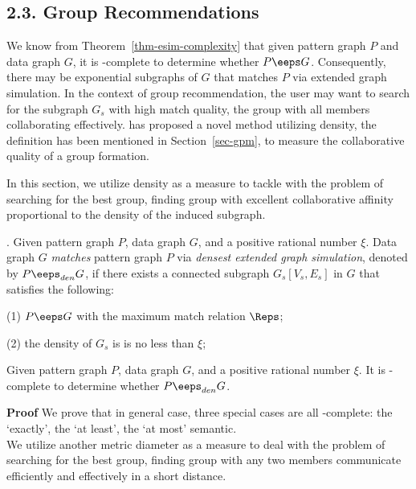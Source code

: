 \subsection*{2.3. Group Recommendations}

We know from Theorem~\ref{thm-esim-complexity} that given pattern graph $P$ and data graph $G$, it is \NP-complete to determine whether $P \eeps G$. Consequently, there may be exponential subgraphs of $G$ that matches $P$ via extended graph simulation. In the context of group recommendation, the user may want to search for the subgraph $G_s$ with high match quality, \ie the group with all members collaborating effectively.\cite{} has proposed a novel method utilizing density, the definition has been mentioned in Section~\ref{sec-gpm}, to measure the collaborative quality of a group formation.

In this section, we utilize density as a measure to tackle with the problem of searching for the best group, \ie finding group with excellent collaborative affinity proportional to the density of the induced subgraph.

. Given pattern graph $P$, data graph $G$, and a positive rational number $\xi$. Data graph $G$ {\em matches} pattern graph $P$  via {\em densest extended graph simulation}, denoted by $P \eeps_{den} G$, if there exists a connected subgraph $G_s[V_s, E_s]$ in $G$ that satisfies the following:

\vspace{0.5ex}
\ni(1) $P \eeps G$ with the maximum match relation $\Reps$;

\vspace{0.5ex}
\ni(2) the density of $G_s$ is is no less than $\xi$;

\begin{theorem}
\label{thm-esim-den-opt-complexity}
Given pattern graph $P$, data graph $G$, and a positive rational number $\xi$. It is \NP-complete to determine whether $P \eeps_{den} G$.
\end{theorem}

\textbf{Proof} We prove that in general case, three special cases are all \NP-complete: the `exactly', the `at least', the `at most' semantic.\\

We utilize another metric diameter as a measure to deal with the problem of searching for the best group, \ie finding group with any two members communicate efficiently and effectively in a short distance.

